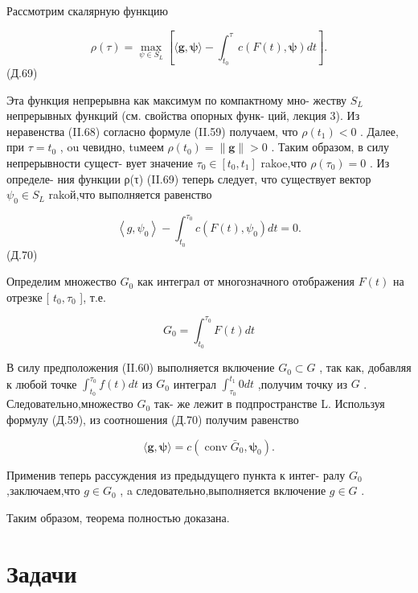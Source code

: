 \documentclass[8pt]{extarticle}
\begin{document}
Рассмотрим скалярную функцию

\[
\rho \left( \tau \right)  = \mathop{\max }\limits_{{\psi  \in  {S}_{L}}}\left\lbrack  {\langle \mathbf{g},\mathbf{\psi }\rangle  - {\int }_{{t}_{0}}^{\tau }c\left( {F\left( t\right) ,\mathbf{\psi }}\right) {dt}}\right\rbrack  .
\]
 (Д.69)

Эта функция непрерывна как максимум по компактному мно- жеству \({S}_{L}\) непрерывных функций (см. свойства опорных функ- ций, лекция 3). Из неравенства (II.68) согласно формуле (II.59) получаем, что \(\rho \left( {t}_{1}\right)  < 0\) . Далее, при \(\tau  = {t}_{0}\) , ou чевидно, tuмеем \(\rho \left( {t}_{0}\right)  = \parallel \mathbf{g}\parallel  > 0\) . Таким образом, в силу непрерывности сущест- вует значение \({\tau }_{0} \in  \left\lbrack  {{t}_{0},{t}_{1}}\right\rbrack\) rakoe,что \(\rho \left( {\tau }_{0}\right)  = 0\) . Из определе- ния функции ρ(τ) (II.69) теперь следует, что существует вектор \({\psi }_{0} \in  {S}_{L}\) rakoй,что выполняется равенство

\[
\left\langle  {g,{\psi }_{0}}\right\rangle   - {\int }_{{t}_{0}}^{{\tau }_{0}}c\left( {F\left( t\right) ,{\psi }_{0}}\right) {dt} = 0.
\]
 (Д.70)

Определим множество \({G}_{0}\) как интеграл от многозначного отображения \(F\left( t\right)\) на отрезке [ \({t}_{0},{\tau }_{0}\) ], т.е.

\[
{G}_{0} = {\int }_{{t}_{0}}^{{\tau }_{0}}F\left( t\right) {dt}
\]

В силу предположения (II.60) выполняется включение \({G}_{0} \subset  G\) , так как, добавляя к любой точке \({\int }_{{t}_{0}}^{{\tau }_{0}}f\left( t\right) {dt}\) из \({G}_{0}\) интеграл \({\int }_{{\tau }_{0}}^{{t}_{1}}{0dt}\) ,получим точку из \(G\) . Следовательно,множество \({G}_{0}\) так- же лежит в подпространстве L. Используя формулу (Д.59), из соотношения (Д.70) получим равенство

\[
\langle \mathbf{g},\mathbf{\psi }\rangle  = c\left( {\operatorname{conv}{\bar{G}}_{0},{\mathbf{\psi }}_{0}}\right) .
\]

Применив теперь рассуждения из предыдущего пункта к интег- ралу \({G}_{0}\) ,заключаем,что \(g \in  {G}_{0}\) , a следовательно,выполняется включение \(g \in  G\) .

Таким образом, теорема полностью доказана.

\section*{Задачи}
\end{document}
